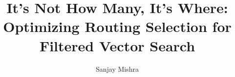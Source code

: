 \documentclass[sigconf, nonacm]{acmart}
\begin{document}
\title{It's Not How Many, It's Where: Optimizing Routing Selection for Filtered Vector Search}

\author{Sanjay Mishra}
\end{document}
